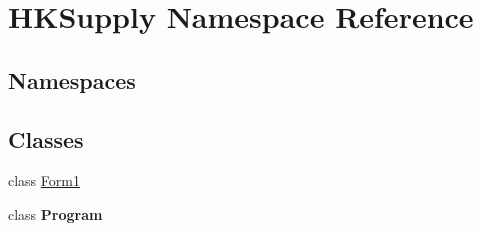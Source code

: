 \hypertarget{namespace_h_k_supply}{}\section{H\+K\+Supply Namespace Reference}
\label{namespace_h_k_supply}
\subsection*{Namespaces}
\begin{DoxyCompactItemize}
\end{DoxyCompactItemize}
\subsection*{Classes}
\begin{DoxyCompactItemize}
\item 
class \hyperlink{class_h_k_supply_1_1_form1}{Form1}
\item 
class {\bfseries Program}
\end{DoxyCompactItemize}
